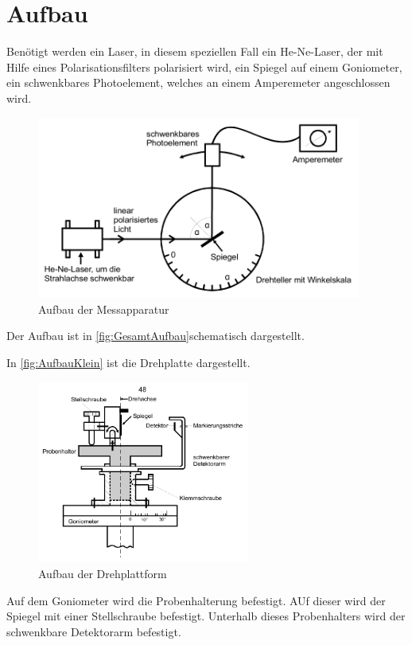 \section{Aufbau}
\label{sec:Aufbau}
Benötigt werden ein Laser, in diesem speziellen Fall ein He-Ne-Laser, der mit Hilfe eines Polarisationsfilters polarisiert wird, ein Spiegel auf einem Goniometer, ein schwenkbares Photoelement, welches an einem Amperemeter angeschlossen wird. 
\begin{figure}
    \centering
    \includegraphics[height = 6cm]{GesamtAufbau.pdf}
    \caption{Aufbau der Messapparatur}
\end{figure}
Der Aufbau ist in \autoref{fig:GesamtAufbau}schematisch dargestellt.

In \autoref{fig:AufbauKlein} ist die Drehplatte dargestellt.
\begin{figure}
    \centering
    \includegraphics[height = 6cm]{AufbauKlein.pdf}
    \caption{Aufbau der Drehplattform}
    \label{fig:AufbauKlein}
\end{figure}
Auf dem Goniometer wird die Probenhalterung befestigt. AUf dieser wird der Spiegel mit einer Stellschraube befestigt. Unterhalb dieses Probenhalters wird der schwenkbare Detektorarm befestigt.
